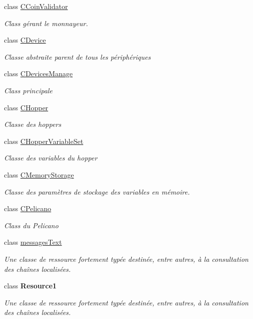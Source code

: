 \begin{DoxyCompactItemize}
class \mbox{\hyperlink{class_device_library_1_1_c_coin_validator}{C\+Coin\+Validator}}
\begin{DoxyCompactList}\small\item\em Class gérant le monnayeur. \end{DoxyCompactList}\item 
class \mbox{\hyperlink{class_device_library_1_1_c_device}{C\+Device}}
\begin{DoxyCompactList}\small\item\em Classe abstraite parent de tous les périphériques \end{DoxyCompactList}\item 
class \mbox{\hyperlink{class_device_library_1_1_c_devices_manage}{C\+Devices\+Manage}}
\begin{DoxyCompactList}\small\item\em Class principale \end{DoxyCompactList}\item 
class \mbox{\hyperlink{class_device_library_1_1_c_hopper}{C\+Hopper}}
\begin{DoxyCompactList}\small\item\em Classe des hoppers \end{DoxyCompactList}\item 
class \mbox{\hyperlink{class_device_library_1_1_c_hopper_variable_set}{C\+Hopper\+Variable\+Set}}
\begin{DoxyCompactList}\small\item\em Classe des variables du hopper \end{DoxyCompactList}\item 
class \mbox{\hyperlink{class_device_library_1_1_c_memory_storage}{C\+Memory\+Storage}}
\begin{DoxyCompactList}\small\item\em Classe des paramètres de stockage des variables en mémoire. \end{DoxyCompactList}\item 
class \mbox{\hyperlink{class_device_library_1_1_c_pelicano}{C\+Pelicano}}
\begin{DoxyCompactList}\small\item\em Class du Pelicano \end{DoxyCompactList}\item 
class \mbox{\hyperlink{class_device_library_1_1messages_text}{messages\+Text}}
\begin{DoxyCompactList}\small\item\em Une classe de ressource fortement typée destinée, entre autres, à la consultation des chaînes localisées. \end{DoxyCompactList}\item 
class {\bfseries Resource1}
\begin{DoxyCompactList}\small\item\em Une classe de ressource fortement typée destinée, entre autres, à la consultation des chaînes localisées. \end{DoxyCompactList}\end{DoxyCompactItemize}
